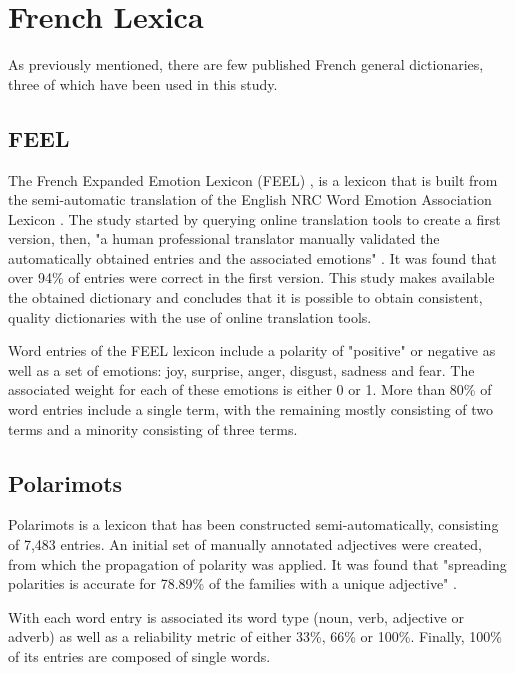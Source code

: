\section{French Lexica}\label{French Lexicons}

As previously mentioned, there are few published French general dictionaries, three of which have been used in this study.

\subsection{FEEL}\label{chap: feel}

The French Expanded Emotion Lexicon (FEEL) \citep{abdaoui2017feel}, is a lexicon that is built from the semi-automatic translation of the English NRC Word Emotion Association Lexicon \citep{mohammad2013crowdsourcing}. The study started by querying online translation tools to create a first version, then, "a human professional translator manually validated the automatically obtained entries and the associated emotions" \citep{abdaoui2017feel}. It was found that over 94\% of entries were correct in the first version. This study makes available the obtained dictionary and concludes that it is possible to obtain consistent, quality dictionaries with the use of online translation tools.

Word entries of the FEEL lexicon include a polarity of "positive" or negative as well as a set of emotions: joy, surprise, anger, disgust, sadness and fear. The associated weight for each of these emotions is either 0 or 1. More than 80\% of word entries include a single term, with the remaining mostly consisting of two terms and a minority consisting of three terms.

\subsection{Polarimots}\label{chap: polarimots}

Polarimots \citep{gala2012propagation} is a lexicon that has been constructed semi-automatically, consisting of 7,483 entries. An initial set of manually annotated adjectives were created, from which the propagation of polarity was applied. It was found that "spreading polarities is accurate for 78.89\% of the families with a unique adjective" \citep{gala2012propagation}.

With each word entry is associated its word type (noun, verb, adjective or adverb) as well as a reliability metric of either 33\%, 66\% or 100\%. Finally, 100\% of its entries are composed of single words.

